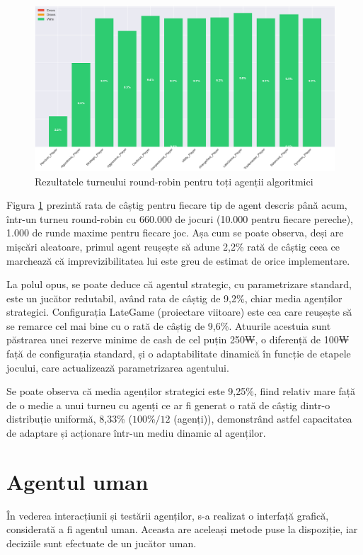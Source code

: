 \begin{figure}[H]
    \centering
    \includegraphics[width=16cm]{images/all_algorithmic agents tournament_win_rates.png}
    \caption{Rezultatele turneului round-robin pentru toți agenții algoritmici}
    \label{fig:all_algorithmic_tournament}
\end{figure}

Figura \ref{fig:all_algorithmic_tournament} prezintă rata de câștig pentru fiecare tip de agent descris până acum, într-un turneu round-robin cu 660.000 de jocuri (10.000 pentru fiecare pereche), 1.000 de runde maxime pentru fiecare joc. Așa cum se poate observa, deși are mișcări aleatoare, primul agent reușește să adune 2,2\% rată de câștig ceea ce marchează că imprevizibilitatea lui este greu de estimat de orice implementare.

La polul opus, se poate deduce că agentul strategic, cu parametrizare standard, este un jucător redutabil, având rata de câștig de 9,2\%, chiar media agenților strategici. Configurația LateGame (proiectare viitoare) este cea care reușește să se remarce cel mai bine cu o rată de câștig de 9,6\%. Atuurile acestuia sunt păstrarea unei rezerve minime de cash de cel puțin 250₩, o diferență de 100₩ față de configurația standard, și o adaptabilitate dinamică în funcție de etapele jocului, care actualizează parametrizarea agentului.

Se poate observa că media agenților strategici este 9,25\%, fiind relativ mare față de o medie a unui turneu cu agenți ce ar fi generat o rată de câștig dintr-o distribuție uniformă, 8,33\% ($100\% / 12$ (agenți)), demonstrând astfel capacitatea de adaptare și acționare într-un mediu dinamic al agenților.

\newpage
\section{Agentul uman}
În vederea interacțiunii și testării agenților, s-a realizat o interfață grafică, considerată a fi agentul uman. Aceasta are aceleași metode puse la dispoziție, iar deciziile sunt efectuate de un jucător uman.

